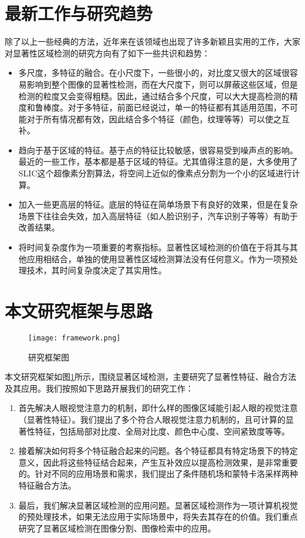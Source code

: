\section{最新工作与研究趋势}
除了以上一些经典的方法，近年来在该领域也出现了许多新颖且实用的工作\cite{borji2012salient}\cite{yan2013hierarchical}\cite{shi2013pisa}\cite{wei2012geodesic}，大家对显著性区域检测的研究方向有了如下一些共识和趋势：
\begin{itemize}
\item 多尺度，多特征的融合。在小尺度下，一些很小的，对比度又很大的区域很容易影响到整个图像的显著性检测，而在大尺度下，则可以屏蔽这些区域，但是检测的粒度又会变得粗糙。因此，通过结合多个尺度，可以大大提高检测的精度和鲁棒度。对于多特征，前面已经说过，单一的特征都有其适用范围，不可能对于所有情况都有效，因此结合多个特征（颜色，纹理等等）可以使之互补。
\item 趋向于基于区域的特征。基于点的特征比较敏感，很容易受到噪声点的影响。最近的一些工作，基本都是基于区域的特征。尤其值得注意的是，大多使用了SLIC\cite{achanta2010slic}这个超像素分割算法，将空间上近似的像素点分割为一个小的区域进行计算。
\item 加入一些更高层的特征。底层的特征在简单场景下有良好的效果，但是在复杂场景下往往会失效，加入高层特征（如人脸识别子，汽车识别子等等）有助于改善结果。
\item 将时间复杂度作为一项重要的考察指标。显著性区域检测的价值在于将其与其他应用相结合，单独的使用显著性区域检测算法没有任何意义。作为一项预处理技术，其时间复杂度决定了其实用性。
\end{itemize}

\section{本文研究框架与思路}
\begin{figure}[h]
\centering
\texttt{[image: framework.png]}
\caption{研究框架图} \label{fig:framework}
\end{figure}

本文研究框架如图\ref{fig:framework}所示，围绕显著区域检测，主要研究了显著性特征、融合方法及其应用。我们按照如下思路开展我们的研究工作：
\begin{enumerate}
\item 首先解决人眼视觉注意力的机制，即什么样的图像区域能引起人眼的视觉注意（显著性特征）。我们提出了多个符合人眼视觉注意力机制的，且可计算的显著性特征，包括局部对比度、全局对比度、颜色中心度、空间紧致度等等。
\item 接着解决如何将多个特征融合起来的问题。各个特征都具有特定场景下的特定意义，因此将这些特征结合起来，产生互补效应以提高检测效果，是非常重要的。针对不同的应用场景和需求，我们提出了条件随机场和蒙特卡洛采样两种特征融合方法。
\item 最后，我们解决显著区域检测的应用问题。显著区域检测作为一项计算机视觉的预处理技术，如果无法应用于实际场景中，将失去其存在的价值。我们重点研究了显著区域检测在图像分割、图像检索中的应用。
\end{enumerate}

